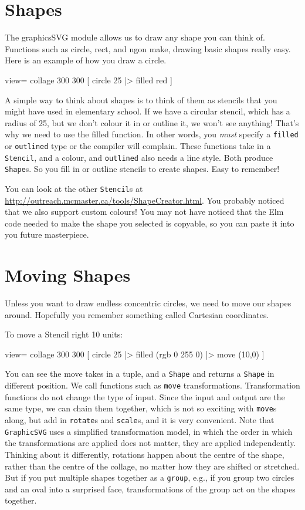 \documentclass[12pt]{amsbook}
\begin{document}
\section{Shapes}
%
The graphicsSVG module allows us to draw any shape you can think of. Functions such as circle, rect, and ngon make, drawing basic shapes really easy. Here is an example of how you draw a circle. 
\begin{code}
	view= collage 300 300 [
							circle 25
								|> filled red
						  ]
\end{code}
A simple way to think about shapes is to think of them as stencils that you might have used in elementary school. If we have a circular stencil, which has a radius of 25, but we don't colour it in or outline it, we won't see anything! That's why we need to use the filled function. In other words, you \emph{must} specify a \verb|filled| or \verb|outlined| type or the compiler will complain. 
These functions take in a \verb|Stencil|, and a colour, and \verb|outlined| also needs a line style.
Both produce \verb|Shape|s.
So you fill in or outline stencils to create shapes.
Easy to remember!

You can look at the other \verb|Stencil|s at \url{http://outreach.mcmaster.ca/tools/ShapeCreator.html}.
You probably noticed that we also support custom colours!
You may not have noticed that the Elm code needed to make the shape you selected 
is copyable, so you can paste it into you future masterpiece.

\section{Moving Shapes}

Unless you want to draw endless concentric circles, we need to move our shapes around.
Hopefully you remember something called Cartesian coordinates.
 
To move a Stencil right 10 units:
\begin{code}
view= collage 300 300 [
						circle 25
							|> filled (rgb 0 255 0)
							|> move (10,0)
					  ]  
\end{code}
You can see the move takes in a tuple, and a \verb|Shape| and returns a \verb|Shape| in different position. 
We call functions such as \verb|move| transformations. 
Transformation functions do not change the type of input.
Since the input and output are the same type, we can chain them together,
which is not so exciting with \verb|move|s along,
but add in \verb|rotate|s and \verb|scale|s, 
and it is very convenient.
Note that \verb|GraphicSVG| uses a simplified transformation model,
in which the order in which the transformations are applied does not matter,
they are applied independently.  
Thinking about it differently, 
rotations happen about the centre of the shape, rather than the centre of the collage,
no matter how they are shifted or stretched.
But if you put multiple shapes together as a \verb|group|, e.g., if you group two circles and an oval into a surprised face, transformations of the group act on the shapes together.
\end{document}
